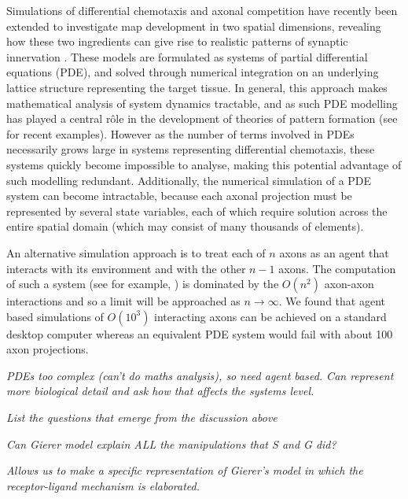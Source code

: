 \documentclass[11pt, a4paper]{article}
\begin{document}
Simulations of differential chemotaxis and axonal competition have recently been extended to investigate map development in two spatial dimensions, revealing how these two ingredients can give rise to realistic patterns of synaptic innervation \citep{james_modelling_2020}.
These models are formulated as systems of partial differential equations (PDE), and solved through numerical integration on an underlying lattice structure representing the target tissue.
In general, this approach makes mathematical analysis of system dynamics tractable, and as such PDE modelling has played a central r\^ole in the development of theories of pattern formation (see \citet{krause_modern_2021} for recent examples).
However as the number of terms involved in PDEs necessarily grows large in systems representing differential chemotaxis, these systems quickly become impossible to analyse, making this potential advantage of such modelling redundant.
Additionally, the numerical simulation of a PDE system can become intractable, because each axonal projection must be represented by several state variables, each of which require solution across the entire spatial domain (which may consist of many thousands of elements).

An alternative simulation approach is to treat each of $n$ axons as an agent that interacts with its environment and with the other $n-1$ axons.
The computation of such a system (see for example, \citet{simpson_simple_2011}) is dominated by the $O(n^2)$ axon-axon interactions and so a limit will be approached as $n\rightarrow \infty$.
We found that agent based simulations of $O(10^3)$ interacting axons can be achieved on a standard desktop computer whereas an equivalent PDE system would fail with about 100 axon projections.

\emph{PDEs too complex (can't do maths analysis), so need agent based. Can represent more biological detail and ask how that affects the systems level.}

\emph{List the questions that emerge from the discussion above}

\emph{Can Gierer model explain ALL the manipulations that S and G did?}

\emph{Allows us to make a specific representation of Gierer's model in which the receptor-ligand mechanism is elaborated.}
\end{document}
